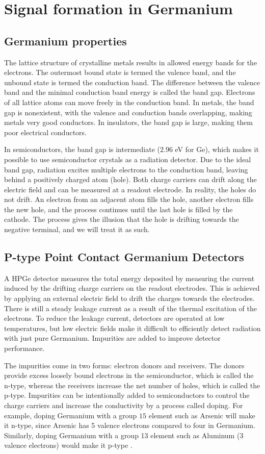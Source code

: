 \section{Signal formation in Germanium}
\subsection{Germanium properties}
The lattice structure of crystalline metals results in allowed energy bands for the electrons. The outermost bound state is termed the valence band, and the unbound state is termed the conduction band. The difference between the valence band and the minimal conduction band energy is called the band gap. Electrons of all lattice atoms can move freely in the conduction band. In metals, the band gap is nonexistent, with the valence and conduction bands overlapping, making metals very good conductors. In insulators, the band gap is large, making them poor electrical conductors.

In semiconductors, the band gap is intermediate ($2.96$ eV for Ge), which makes it possible to use semiconductor crystals as a radiation detector. Due to the ideal band gap, radiation excites multiple electrons to the conduction band, leaving behind a positively charged atom (hole). Both charge carriers can drift along the electric field and can be measured at a readout electrode. In reality, the holes do not drift. An electron from an adjacent atom fills the hole, another electron fills the new hole, and the process continues until the last hole is filled by the cathode. The process gives the illusion that the hole is drifting towards the negative terminal, and we will treat it as such. 

\subsection{P-type Point Contact Germanium Detectors}
A HPGe detector measures the total energy deposited by measuring the current induced by the drifting charge carriers on the readout electrodes. This is achieved by applying an external electric field to drift the charges towards the electrodes. There is still a steady leakage current as a result of the thermal excitation of the electrons. To reduce the leakage current, detectors are operated at low temperatures, but low electric fields make it difficult to efficiently detect radiation with just pure Germanium. Impurities are added to improve detector performance.

The impurities come in two forms: electron donors and receivers. The donors provide excess loosely bound electrons in the semiconductor, which is called the n-type, whereas the receivers increase the net number of holes, which is called the p-type. Impurities can be intentionally added to semiconductors to control the charge carriers and increase the conductivity by a process called doping. For example, doping Germanium with a group $15$ element such as Arsenic will make it n-type, since Arsenic has 5 valence electrons compared to four in Germanium. Similarly, doping Germanium with a group 13 element such as Aluminum (3 valence electrons) would make it p-type \cite{knoll_2010}.

